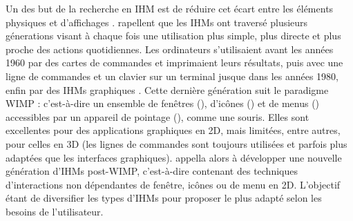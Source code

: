 Un des but de la recherche en IHM est de réduire cet écart entre les éléments physiques et d'affichages \cite{VanDam1997}. \cite{Jacob2008} rapellent que les IHMs ont traversé plusieurs génerations visant à chaque fois une utilisation plus simple, plus directe et plus proche des actions quotidiennes. Les ordinateurs s'utilisaient avant les années 1960 par des cartes de commandes et imprimaient leurs résultats, puis avec une ligne de commandes et un clavier sur un terminal jusque dans les années 1980, enfin par des IHMs graphiques . Cette dernière génération suit le paradigme WIMP : c'est-à-dire un ensemble de fenêtres (), d'icônes () et de menus () accessibles par un appareil de pointage (), comme une souris. Elles sont excellentes pour des applications graphiques en 2D, mais limitées, entre autres, pour celles en 3D (les lignes de commandes sont toujours utilisées et parfois plus adaptées que les interfaces graphiques). \cite{VanDam1997} appella alors à développer une nouvelle génération d'IHMs post-WIMP, c'est-à-dire contenant des techniques d'interactions non dépendantes de fenêtre, icônes ou de menu en 2D. L'objectif étant de diversifier les types d'IHMs pour proposer le plus adapté selon les besoins de l'utilisateur.


